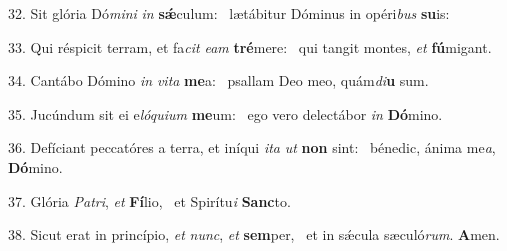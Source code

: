 32. Sit glória Dó\textit{mi}\textit{ni} \textit{in} \textbf{sǽ}culum: \ast\  lætábitur Dóminus in opéri\textit{bus} \textbf{su}is:\

33. Qui réspicit terram, et fa\textit{cit} \textit{e}\textit{am} \textbf{tré}mere: \ast\  qui tangit montes, \textit{et} \textbf{fú}migant.\

34. Cantábo Dómino \textit{in} \textit{vi}\textit{ta} \textbf{me}a: \ast\  psallam Deo meo, quám\textit{di}\textbf{u} sum.\

35. Jucúndum sit ei e\textit{ló}\textit{qui}\textit{um} \textbf{me}um: \ast\  ego vero delectábor \textit{in} \textbf{Dó}mino.\

36. Defíciant peccatóres a terra, et iníqui \textit{i}\textit{ta} \textit{ut} \textbf{non} sint: \ast\  bénedic, ánima me\textit{a}, \textbf{Dó}mino.\

37. Glória \textit{Pa}\textit{tri}, \textit{et} \textbf{Fí}lio, \ast\  et Spirítu\textit{i} \textbf{Sanc}to.\

38. Sicut erat in princípio, \textit{et} \textit{nunc}, \textit{et} \textbf{sem}per, \ast\  et in sǽcula sæculó\textit{rum}. \textbf{A}men.\

